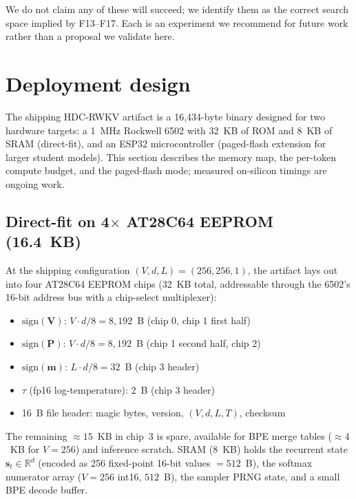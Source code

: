 \documentclass[runningheads]{llncs}
\newcommand{\bV}{\mathbf{V}}
\newcommand{\bP}{\mathbf{P}}
\newcommand{\bm}{\mathbf{m}}
\newcommand{\bs}{\mathbf{s}}
\begin{document}
We do not claim any of these will succeed; we identify them as the
correct search space implied by F13--F17. Each is an experiment we
recommend for future work rather than a proposal we validate here.


\section{Deployment design}
\label{sec:deploy}

The shipping HDC-RWKV artifact is a 16{,}434-byte binary designed
for two hardware targets: a 1~MHz Rockwell 6502 with 32~KB of ROM
and 8~KB of SRAM (direct-fit), and an ESP32 microcontroller
(paged-flash extension for larger student models). This section
describes the memory map, the per-token compute budget, and the
paged-flash mode; measured on-silicon timings are ongoing work.

\subsection{Direct-fit on 4$\times$ AT28C64 EEPROM (16.4~KB)}

At the shipping configuration $(V,d,L)=(256,256,1)$, the artifact
lays out into four AT28C64 EEPROM chips (32~KB total, addressable
through the 6502's 16-bit address bus with a chip-select multiplexer):

\begin{itemize}
  \item $\mathrm{sign}(\bV)$: $V\cdot d/8 = 8{,}192$~B (chip 0, chip 1 first half)
  \item $\mathrm{sign}(\bP)$: $V\cdot d/8 = 8{,}192$~B (chip 1 second half, chip 2)
  \item $\mathrm{sign}(\bm)$: $L\cdot d/8 = 32$~B (chip 3 header)
  \item $\tau$ (fp16 log-temperature): 2~B (chip 3 header)
  \item 16~B file header: magic bytes, version, $(V, d, L, T)$, checksum
\end{itemize}

The remaining ${\approx}15$~KB in chip~3 is spare, available for
BPE merge tables (${\approx}4$~KB for $V{=}256$) and inference
scratch. SRAM ($8$~KB) holds the recurrent state
$\bs_t \in \mathbb{R}^{d}$ (encoded as 256 fixed-point 16-bit values
${=}512$~B), the softmax numerator array ($V=256$ int16, $512$~B),
the sampler PRNG state, and a small BPE decode buffer.
\end{document}
